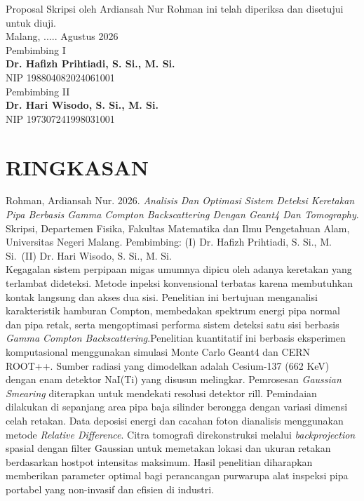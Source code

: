 \documentclass[12pt,a4paper]{report}
\newcommand{\dosenSatu}{Dr. Hafizh Prihtiadi, S. Si., M. Si.}
\newcommand{\nipSatu}{198804082024061001}
\newcommand{\dosenDua}{Dr. Hari Wisodo, S. Si., M. Si.}
\newcommand{\nipDua}{197307241998031001}
\begin{document}
    \noindent Proposal Skripsi oleh Ardiansah Nur Rohman ini telah diperiksa dan disetujui untuk diuji.\\[1cm]

    
    \noindent Malang, ..... Agustus 2026\\
    \noindent
    Pembimbing I\\[2cm]
    \textbf{\dosenSatu}\\
    NIP \nipSatu\\[1.5cm] %

    \noindent
    Pembimbing II\\[2cm]
    \textbf{\dosenDua}\\
    NIP \nipDua

    \newpage
    \chapter*{RINGKASAN}
    \singlespacing %

    \noindent Rohman, Ardiansah Nur. 2026. \textit{Analisis Dan Optimasi Sistem Deteksi Keretakan Pipa Berbasis Gamma Compton Backscattering Dengan Geant4 Dan Tomography}. Skripsi, Departemen Fisika, Fakultas Matematika dan Ilmu Pengetahuan Alam, Universitas Negeri Malang. Pembimbing: (I) \dosenSatu\ (II) \dosenDua\\[1em]

    Kegagalan sistem perpipaan migas umumnya dipicu oleh adanya keretakan yang terlambat dideteksi. Metode inpeksi konvensional terbatas karena membutuhkan kontak langsung dan akses dua sisi. Penelitian ini bertujuan menganalisi karakteristik hamburan Compton, membedakan spektrum energi pipa normal dan pipa retak, serta mengoptimasi performa sistem deteksi satu sisi berbasis \textit{Gamma Compton Backscattering}.Penelitian kuantitatif ini berbasis eksperimen komputasional menggunakan simulasi Monte Carlo Geant4 dan CERN ROOT++. Sumber radiasi yang dimodelkan adalah Cesium-137 (662 KeV) dengan enam detektor NaI(Ti) yang disusun melingkar. Pemrosesan \textit{Gaussian Smearing} diterapkan untuk mendekati resolusi detektor rill. Pemindaian dilakukan di sepanjang area pipa baja silinder berongga dengan variasi dimensi celah retakan. Data deposisi energi dan cacahan foton dianalisis menggunakan metode \textit{Relative Difference}. Citra tomografi direkonstruksi melalui \textit{backprojection} spasial dengan filter Gaussian untuk memetakan lokasi dan ukuran retakan berdasarkan hostpot intensitas maksimum. Hasil penelitian diharapkan memberikan parameter optimal bagi perancangan purwarupa alat inspeksi pipa portabel yang non-invasif dan efisien di industri. \\[1em]
\end{document}
